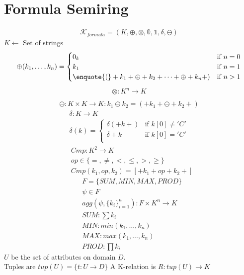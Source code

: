 \documentclass{article}
\newcommand{\dq}[1]{\text{\enquote{#1}}}
\begin{document}
\section{Formula Semiring}
\begin{align*}
  \mathcal{K}_{formula} = (K, \oplus, \otimes, \mathbb{0}, \mathbb{1}, \delta, \ominus)
\end{align*}
$K \leftarrow$ Set of strings\\
\begin{align*}
\oplus (k_1,\dots, k_n) = \begin{cases}
    0_k & \text{if } n = 0\\
    k_1 & \text{if } n = 1\\
    \dq{(}+k_1 + \oplus + k_2 + \dots + \oplus + k_n +) & \text{if } n > 1  
\end{cases}
\end{align*}
\begin{align*}
  \otimes: K^n \rightarrow K \\
\end{align*}
\begin{align*}
  \ominus: K\times K \rightarrow K: k_1 \ominus k_2 = (+k_1+ \ominus +k_2+)
\end{align*} 
\begin{align*}
\delta: K \rightarrow K\\
\delta(k) = \begin{cases}
    \delta(+k+) & \text{if } k[0] \neq 'C'\\
    \delta +k & \text{if } k[0] = 'C'\\
    \end{cases}
\end{align*}
\begin{align*}
  &Cmp: K^2 \rightarrow K\\
  &op\in\{=,\neq, <, \leq, >, \geq\}\\
  &Cmp(k_1, op, k_2) = [+k_1 + op + k_2 +]
\end{align*}
\begin{align*}
&F=\{SUM, MIN, MAX, PROD\}\\
&\psi \in F \\
&agg(\psi, \{k_i\}^n_{i=1}): F \times K^n \rightarrow K\\
&SUM: \sum k_i\\
&MIN: min(k_1, \dots, k_n)\\
&MAX: max(k_1, \dots, k_n)\\
&PROD: \prod k_i
\end{align*}
$U$ be the set of attributes on domain $D$.\\
Tuples are $tup(U) = \{t: U \rightarrow D\}$
A K-relation is $R: tup(U) \rightarrow K$
\end{document}

